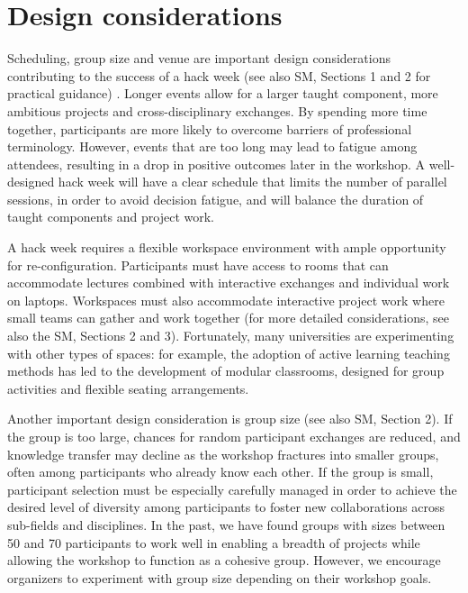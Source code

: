 \section*{Design considerations}

Scheduling, group size and venue are important design considerations contributing to the success of a hack week (see also SM, Sections 1 and 2 for practical guidance) .   
Longer events allow for a larger taught component, more ambitious projects and cross-disciplinary exchanges. 
By spending more time together, participants are more likely to overcome barriers of professional terminology.
However, events that are too long may lead to fatigue among attendees, resulting in a drop in positive outcomes later in the workshop.
A well-designed hack week will have a clear schedule that limits the number of parallel sessions, in order to avoid decision fatigue, and will balance the duration of taught components and project work. 

A hack week requires a flexible workspace environment with ample opportunity for re-configuration. 
Participants must have access to rooms that can accommodate lectures combined with interactive exchanges and individual work on laptops. 
Workspaces must also accommodate interactive project work where small teams can gather and work together (for more detailed considerations, see also the SM, Sections 2 and 3).    
Fortunately, many universities are experimenting with other types of spaces: for example, the adoption of active learning teaching methods \cite{prince2004} has led to the development of modular classrooms, designed for group activities and flexible seating arrangements.

Another important design consideration is group size (see also SM, Section 2).
If the group is too large, chances for random participant exchanges are reduced, and knowledge transfer may decline as the workshop fractures into smaller groups, often among participants who already know each other.
If the group is small, participant selection must be especially carefully managed in order to achieve the desired level of diversity among participants to foster new collaborations across sub-fields and disciplines.
In the past, we have found groups with sizes between 50 and 70 participants to work well in enabling a breadth of projects while allowing the workshop to function as a cohesive group. However, we encourage organizers to experiment with group size depending on their workshop goals.

